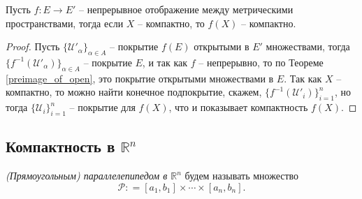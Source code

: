 \begin{theorem}\label{image_of_compact}
    Пусть $f:E\to E'$ -- непрерывное отображение между метрическими пространствами, тогда если $X$ -- компактно, то $f(X)$ -- компактно.
\end{theorem}

\begin{proof}
    Пусть $\{\mathscr{U}'_\alpha\}_{\alpha \in A}$ -- покрытие $f(E)$ открытыми в $E'$ множествами, тогда $\{f^{-1}(\mathscr{U}'_\alpha)\}_{\alpha \in A}$ -- покрытие $E$, и так как $f$ -- непрерывно, то по Теореме \ref{preimage_of_open}, это покрытие открытыми множествами в $E.$ Так как $X$ -- компактно, то можно найти конечное подпокрытие, скажем, $\{f^{-1}(\mathscr{U}'_i)\}_{i=1}^n$, но тогда $\{\mathscr{U}_i\}_{i=1}^n$ -- покрытие для $f(X)$, что и показывает компактность $f(X).$
\end{proof}


\subsection{Компактность в $\mathbb{R}^n$}

\textit{(Прямоугольным) параллелепипедом в $\mathbb{R}^n$} будем называть множество 
\[
  \mathcal{P}: = [a_1, b_1] \times \cdots \times [a_n, b_n].
\]


